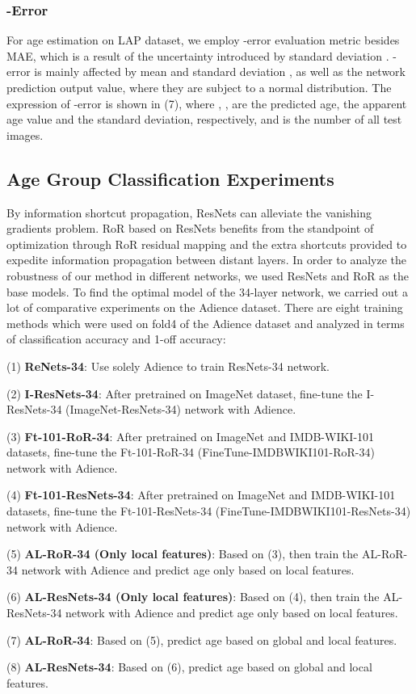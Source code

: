 \documentclass[journal]{IEEEtran}
\begin{document}
\subsubsection{-Error}
\par
For age estimation on LAP dataset, we employ -error evaluation metric besides MAE, which is a result of the uncertainty introduced by standard deviation . -error is mainly affected by mean  and standard deviation , as well as the network prediction output value, where they are subject to a normal distribution. The expression of -error is shown in (7), where , ,  are the predicted age, the apparent age value and the standard deviation, respectively, and  is the number of all test images.


\subsection{Age Group Classification Experiments}
By information shortcut propagation, ResNets can alleviate the vanishing gradients problem. RoR based on ResNets benefits from the standpoint of optimization through RoR residual mapping and the extra shortcuts provided to expedite information propagation between distant layers. In order to analyze the robustness of our method in different networks, we used ResNets and RoR as the base models. To find the optimal model of the 34-layer network, we carried out a lot of comparative experiments on the Adience dataset. There are eight training methods which were used on fold4 of the Adience dataset and analyzed in terms of classification accuracy and 1-off accuracy:
\par
(1)\textbf{ ReNets-34}: Use solely Adience to train ResNets-34 network.
\par
(2) \textbf{I-ResNets-34}: After pretrained on ImageNet dataset, fine-tune the I-ResNets-34 (ImageNet-ResNets-34) network with Adience.
\par
(3) \textbf{Ft-101-RoR-34}: After pretrained on ImageNet and IMDB-WIKI-101 datasets, fine-tune the Ft-101-RoR-34 (FineTune-IMDBWIKI101-RoR-34) network with Adience.
\par
(4) \textbf{Ft-101-ResNets-34}: After pretrained on ImageNet and IMDB-WIKI-101 datasets, fine-tune the Ft-101-ResNets-34 (FineTune-IMDBWIKI101-ResNets-34) network with Adience.
\par
(5) \textbf{AL-RoR-34 (Only local features)}: Based on (3), then train the AL-RoR-34 network with Adience and predict age only based on local features.
\par
(6) \textbf{AL-ResNets-34 (Only local features)}: Based on (4), then train the AL-ResNets-34 network with Adience and predict age only based on local features.
\par
(7) \textbf{AL-RoR-34}: Based on (5), predict age based on global and local features.
\par
(8) \textbf{AL-ResNets-34}: Based on (6), predict age based on global and local features.
\end{document}
